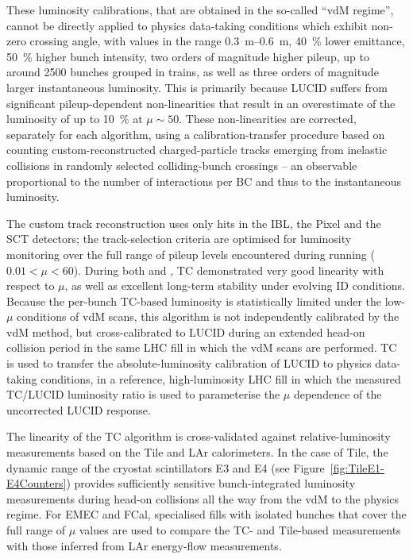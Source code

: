 \documentclass[cernpreprint, atlasdraft=false, UKenglish,british,orcidlogo, texmf, orcidlogo]{atlasdoc}
\begin{document}
These luminosity calibrations, that are obtained in the so-called ``\gls{vdM} regime'', cannot be directly applied to physics data-taking conditions which exhibit non-zero crossing angle, with \betastar values in the range \SIrange{0.3}{0.6}{\m}, \SI{40}{\percent} lower emittance, \SI{50}{\percent} higher bunch intensity, two orders of magnitude higher pileup, up to around \num{2500}  bunches grouped in trains, as well as three orders of magnitude larger instantaneous luminosity. This is primarily because \gls{LUCID} suffers from significant pileup-dependent non-linearities that result in an overestimate of the luminosity of up to \SI{10}{\percent} at $\mu \sim 50$. These non-linearities are corrected, separately for each algorithm, using a calibration-transfer procedure based on counting custom-reconstructed charged-particle tracks emerging from inelastic collisions in randomly selected colliding-bunch crossings -- an observable proportional to the number of \pp interactions per \gls{BC} and thus to the instantaneous luminosity.
 
The custom track reconstruction uses only hits in the \gls{IBL}, the \gls{Pixel} and the \gls{SCT} detectors; the track-selection criteria are optimised for luminosity monitoring over the full range of pileup levels encountered during \pp running ($0.01 < \mu < 60$). During both \RunOne and \RunTwo, \gls{TC} demonstrated very good linearity with respect to $\mu$, as well as excellent long-term stability under evolving \gls{ID} conditions. Because the per-bunch \gls{TC}-based luminosity is statistically limited under the low-$\mu$ conditions of \gls{vdM} scans, this algorithm is not independently calibrated by the \gls{vdM} method, but cross-calibrated to \gls{LUCID} during an extended head-on collision period in the same \gls{LHC} fill in which the \gls{vdM} scans are performed. \gls{TC} is used to transfer the absolute-luminosity calibration of \gls{LUCID} to physics data-taking conditions, in a reference, high-luminosity \gls{LHC} fill in which the measured \gls{TC}/\gls{LUCID} luminosity ratio is used to parameterise the $\mu$ dependence of the uncorrected \gls{LUCID} response.
 
The linearity of the \gls{TC} algorithm is cross-validated against relative-luminosity measurements based on the \gls{Tile} and \gls{LAr} calorimeters. In the case of \gls{Tile}, the dynamic range of the cryostat scintillators E3 and E4 (see Figure~\ref{fig:TileE1-E4Counters}) provides sufficiently sensitive bunch-integrated luminosity measurements during head-on collisions all the way from the \gls{vdM} to the physics regime. For \gls{EMEC} and \gls{FCal}, specialised fills with isolated bunches that cover the full range of $\mu$ values are used to compare the \gls{TC}- and \gls{Tile}-based measurements with those inferred from \gls{LAr} energy-flow measurements.
 
\end{document}
